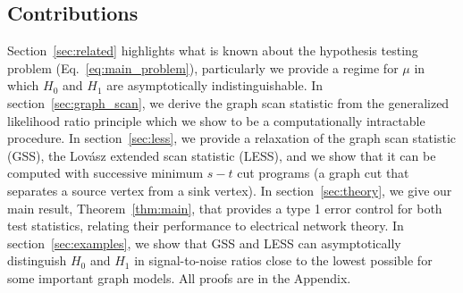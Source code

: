 \subsection{Contributions}
\vspace{-.1cm}
Section~\ref{sec:related} highlights what is known about the hypothesis testing problem (Eq.~\ref{eq:main_problem}), particularly we provide a regime for $\mu$ in which $H_0$ and $H_1$ are asymptotically indistinguishable.
In section~\ref{sec:graph_scan}, we derive the graph scan statistic from the generalized likelihood ratio principle which we show to be a computationally intractable procedure.
In section~\ref{sec:less}, we provide a relaxation of the graph scan statistic (GSS), the Lov\'asz extended scan statistic (LESS), and we show that it can be computed with successive minimum $s-t$ cut programs (a graph cut that separates a source vertex from a sink vertex).
In section~\ref{sec:theory}, we give our main result, Theorem~\ref{thm:main}, that provides a type 1 error control for both test statistics, relating their performance to electrical network theory.
In section~\ref{sec:examples}, we show that GSS and LESS can asymptotically distinguish $H_0$ and $H_1$ in signal-to-noise ratios close to the lowest possible for some important graph models. 
All proofs are in the Appendix.

